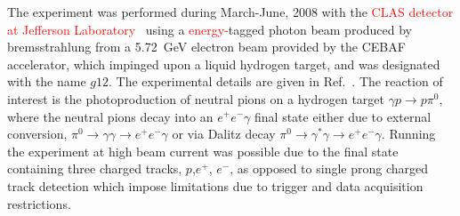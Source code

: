 \documentclass[aps,prc,twocolumn,floatfix,showpacs,preprintnumbers,amsmath,amssymb,superscriptaddress,linenumbers]{revtex4-1}
\begin{document}
The experiment was performed during March-June, 2008
with the \textcolor{red}{CLAS detector at Jefferson Laboratory~\cite{meck}} using a \textcolor{red}{energy-}tagged photon beam produced by 
bremsstrahlung from a 5.72~GeV electron beam provided by the CEBAF 
accelerator, which impinged upon a liquid hydrogen target,
and was designated with the name $g12$. 
The experimental details are given in Ref.~\cite{g12}. The reaction 
of interest is the photoproduction of neutral pions on a hydrogen 
target $\gamma p\rightarrow p\pi^0$, 
where the neutral pions decay into an $e^+e^-\gamma$ final state either due to external conversion, $\pi^0 \rightarrow\gamma\gamma 
\rightarrow e^+e^-\gamma$ or via Dalitz decay $\pi^0
\rightarrow\gamma^\ast\gamma\rightarrow e^+e^-\gamma$. Running the 
experiment at high beam current was possible due to the final state 
containing three charged tracks, $p$,$e^+$, $e^-$, as opposed to single 
prong charged track detection which impose limitations due to trigger 
and data acquisition restrictions.

\end{document}
